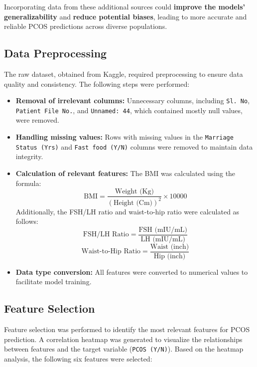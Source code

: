 \documentclass{article}
\begin{document}
Incorporating data from these additional sources could \textbf{improve the models' generalizability} and \textbf{reduce potential biases}, leading to more accurate and reliable PCOS predictions across diverse populations.


\subsection{Data Preprocessing}

The raw dataset, obtained from Kaggle, required preprocessing to ensure data quality and consistency. The following steps were performed:

\begin{itemize}
    \item \textbf{Removal of irrelevant columns:} Unnecessary columns, including \texttt{Sl. No}, \texttt{Patient File No.}, and \texttt{Unnamed: 44}, which contained mostly null values, were removed.
    \item \textbf{Handling missing values:} Rows with missing values in the \texttt{Marriage Status (Yrs)} and \texttt{Fast food (Y/N)} columns were removed to maintain data integrity.
    \item \textbf{Calculation of relevant features:} The BMI was calculated using the formula:
    \[
    \text{BMI} = \frac{\text{Weight (Kg)}}{\left(\text{Height (Cm)}\right)^2} \times 10000
    \]
    Additionally, the FSH/LH ratio and waist-to-hip ratio were calculated as follows:
    \[
    \text{FSH/LH Ratio} = \frac{\text{FSH (mIU/mL)}}{\text{LH (mIU/mL)}}
    \]
    \[
    \text{Waist-to-Hip Ratio} = \frac{\text{Waist (inch)}}{\text{Hip (inch)}}
    \]
    \item \textbf{Data type conversion:} All features were converted to numerical values to facilitate model training.
\end{itemize}

\subsection{Feature Selection}

Feature selection was performed to identify the most relevant features for PCOS prediction. A correlation heatmap was generated to visualize the relationships between features and the target variable (\texttt{PCOS (Y/N)}). Based on the heatmap analysis, the following six features were selected:
\end{document}
